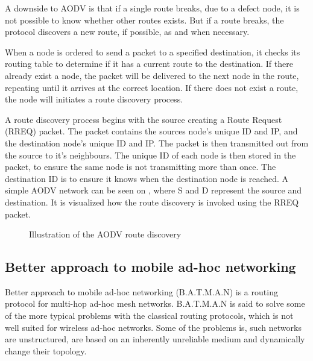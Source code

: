 A downside to AODV is that if a single route breaks, due to a defect node, it is not possible to know whether other routes exists.
But if a route breaks, the protocol discovers a new route, if possible, as and when necessary.

When a node is ordered to send a packet to a specified destination, it checks its routing table to determine if it has a current route to the destination.
If there already exist a node, the packet will be delivered to the next node in the route, repeating until it arrives at the correct location.
If there does not exist a route, the node will initiates a route discovery process.

A route discovery process begins with the source creating a Route Request (RREQ) packet.
The packet contains the sources node's unique ID and IP, and the destination node's unique ID and IP.
The packet is then transmitted out from the source to it's neighbours.
The unique ID of each node is then stored in the packet, to ensure the same node is not transmitting more than once.
The destination ID is to ensure it knows when the destination node is reached.
A simple AODV network can be seen on , where S and D represent the source and destination. It is visualized how the route discovery is invoked using the RREQ packet.\cite{AOVD2}

\begin{figure}[!h]
	\centering
	\caption{Illustration of the AODV route discovery}
	\label{fig:AODVfigure}
\end{figure}

\subsection{Better approach to mobile ad-hoc networking}
Better approach to mobile ad-hoc networking (B.A.T.M.A.N) is a routing protocol for multi-hop ad-hoc mesh networks. 
B.A.T.M.A.N is said to solve some of the more typical problems with the classical routing protocols, which is not well suited for wireless ad-hoc networks.
Some of the problems is, such networks  are unstructured, are based on an inherently unreliable medium and dynamically change their topology.

